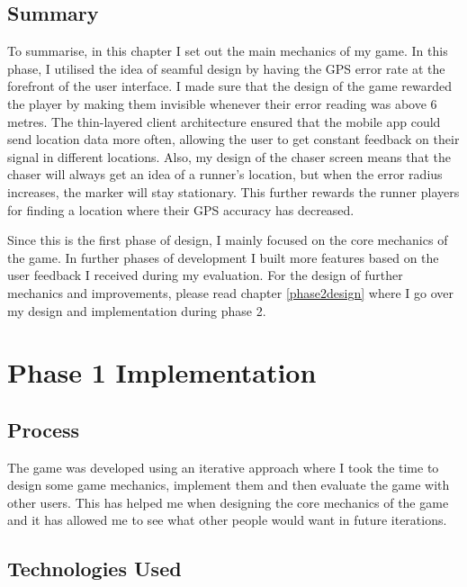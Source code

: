 \documentclass{l4proj}
\begin{document}
\section{Summary}
To summarise, in this chapter I set out the main mechanics of my game. In this phase, I utilised the idea of seamful design
by having the GPS error rate at the forefront of the user interface. I made sure that the design of the game rewarded the player
by making them invisible whenever their error reading was above 6 metres. The thin-layered client architecture ensured that the
mobile app could send location data more often, allowing the user to get constant feedback on their signal in different locations.
Also, my design of the chaser screen means that the chaser will always get an idea of a runner's location, but when the error radius
increases, the marker will stay stationary. This further rewards the runner players for finding a location where their GPS accuracy
has decreased.

Since this is the first phase of design, I mainly focused on the core mechanics of the game. In further phases of development I
built more features based on the user feedback I received during my evaluation. For the design of further mechanics and improvements,
please read chapter \ref{phase2design} where I go over my design and implementation during phase 2.


\chapter{Phase 1 Implementation}
\label{phase1implementation}

\section{Process}
\label{process}
The game was developed using an iterative approach where I took the time to design some game mechanics, implement them and
then evaluate the game with other users. This has helped me when designing the core mechanics of the game and it has allowed me
to see what other people would want in future iterations.

\section{Technologies Used}
\end{document}
